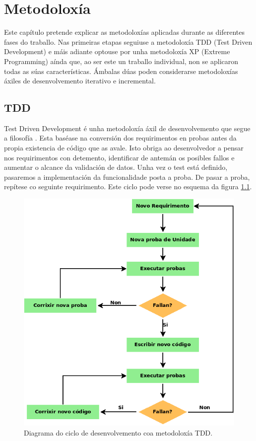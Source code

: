 \chapter[Metodoloxía]{
  \label{chp:metodoloxia}
  Metodoloxía
}
\minitoc
\newpage

Este capítulo pretende explicar as metodoloxías aplicadas durante as diferentes fases do traballo. Nas primeiras etapas seguiuse a metodoloxía TDD (Test Driven Development) e máis adiante optouse por unha metodoloxía XP (Extreme Programming) aínda que, ao ser este un traballo individual, non se aplicaron todas as súas características. Ámbalas dúas poden considerarse metodoloxías áxiles de desenvolvemento iterativo e incremental.

\section{TDD}

Test Driven Development é unha metodoloxía áxil de desenvolvemento que segue a filosofía . Esta baséase na conversión dos requirimentos en probas antes da propia existencia de código que as avale. Isto obriga ao desenvolvedor a pensar nos requirimentos con detemento, identificar de antemán os posibles fallos e aumentar o alcance da validación de datos. Unha vez o test está definido, pasaremos a implementación da funcionalidade posta a proba. De pasar a proba, repítese co seguinte requirimento. Este ciclo pode verse no esquema da figura \ref{fig:tdd}.

\begin{figure}[h]
	\centering
	\includegraphics[scale=0.55,keepaspectratio=true]{./images/TDD.png}
	\caption{Diagrama do ciclo de desenvolvemento coa metodoloxía TDD.}
	\label{fig:tdd}
\end{figure}

